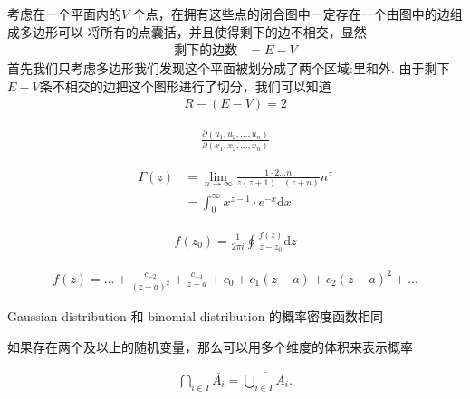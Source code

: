 \begin{thm}
考虑在一个平面内的$ V $ 个点，在拥有这些点的闭合图中一定存在一个由图中的边组成多边形可以
将所有的点囊括，并且使得剩下的边不相交，显然
\begin{align*}
		\text{剩下的边数}&= E-V 
\end{align*}
首先我们只考虑多边形我们发现这个平面被划分成了两个区域:里和外.
由于剩下$ E-V $条不相交的边把这个图形进行了切分，我们可以知道
 \begin{align*}
		R-(E-V) = 2
\end{align*}
\end{thm}
\begin{thm}
		\begin{align*}
				\frac{\partial (u_1,u_2,\ldots,u_n)}{\partial (x_1,x_2,\ldots,x_{n})} 
		\end{align*}
\end{thm}
\begin{thm}
		\begin{align*}
				\Gamma (z) &= \lim_{ n \to \infty} \frac{1 \cdot 2 \ldots n}{z(z+1)\ldots(z+n)}n^z \\
				&= \int_{ 0}^{\infty} x^{z-1} \cdot  e^{- x}\mathrm{d}x  
		\end{align*}
\end{thm}
\begin{thm}
\begin{align*}
	f(z_0) = \frac{1}{2\pi i}  \oint \frac{f(z)}{z-z_0}  \mathrm{d}z
\end{align*}
\end{thm}
\begin{thm}
\begin{align*}
		f(z) = \ldots+ \frac{c_{-2}}{(z-a)^2}  + \frac{c_{-1}}{z-a} + c_0 + c_1(z-a) + c_2(z-a)^2+\ldots
\end{align*}
\end{thm}
\begin{thm}
		[高斯分布与二项分布]
		Gaussian distribution 和 binomial distribution 的概率密度函数相同
\end{thm}
\begin{thm}
		[概率与几何概率]
		如果存在两个及以上的随机变量，那么可以用多个维度的体积来表示概率
\end{thm}
\begin{thm}
\begin{align*}
		\bigcap_{i \in  I} \overline{A_i}  = \overline{\bigcup_{i \in  I} A_i}
.\end{align*}
\end{thm}
